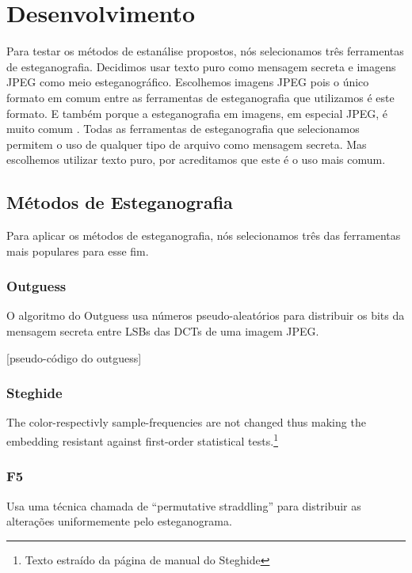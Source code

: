 \chapter{Desenvolvimento}

Para testar os métodos de estanálise propostos, nós selecionamos três ferramentas de esteganografia. Decidimos usar texto puro como mensagem secreta e imagens JPEG como meio esteganográfico. Escolhemos imagens JPEG pois o único formato em comum entre as ferramentas de esteganografia que utilizamos é este formato. E também porque a esteganografia em imagens, em especial JPEG, é muito comum \cite{?}. Todas as ferramentas de esteganografia que selecionamos permitem o uso de qualquer tipo de arquivo como mensagem secreta. Mas escolhemos utilizar texto puro, por acreditamos que este é o uso mais comum.


\section{Métodos de Esteganografia}

Para aplicar os métodos de esteganografia, nós selecionamos três das ferramentas mais populares para esse fim.

\subsection{Outguess}

O algoritmo do Outguess usa números pseudo-aleatórios para distribuir os bits da mensagem secreta entre LSBs das DCTs de uma imagem JPEG. \cite{provos_hide_2003}

[pseudo-código do outguess]

\subsection{Steghide}

\begin{citacao}[english]
The color-respectivly sample-frequencies are not changed thus making the embedding resistant against first-order statistical tests.\footnote{Texto estraído da página de manual do Steghide}
\end{citacao}

\subsection{F5}

Usa uma técnica chamada de ``permutative straddling'' para distribuir as alterações uniformemente pelo esteganograma.

